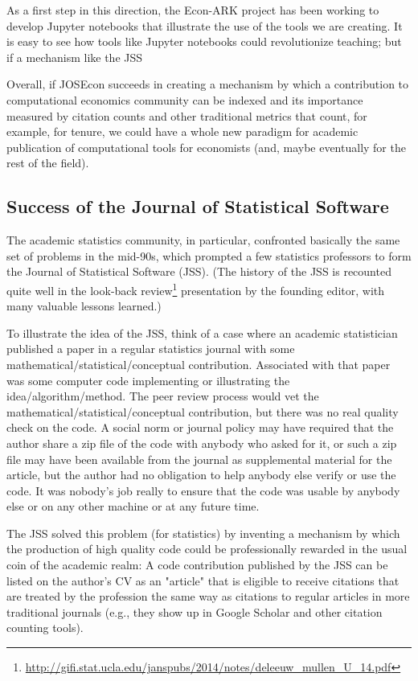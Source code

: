 As a first step in this direction, the Econ-ARK project has been working to develop Jupyter notebooks that illustrate the use of the tools we are creating. It is easy to see how tools like Jupyter notebooks could revolutionize teaching; but if a mechanism like the JSS 

Overall, if JOSEcon succeeds in creating a mechanism by which a contribution to computational economics community can be indexed and its importance measured by citation counts and other traditional metrics that count, for example, for tenure, we could have a whole new paradigm for academic publication of computational tools for economists (and, maybe eventually for the rest of the field).


\subsection{Success of the Journal of Statistical Software}

The academic statistics community, in particular, confronted basically the same set of problems in the mid-90s, which prompted a few statistics professors to form the Journal of Statistical Software (JSS). (The history of the JSS is recounted quite well in the look-back review\footnote{\url{http://gifi.stat.ucla.edu/janspubs/2014/notes/deleeuw_mullen_U_14.pdf}} presentation by the founding editor, with many valuable lessons learned.)


To illustrate the idea of the JSS, think of a case where an academic statistician published a paper in a regular statistics journal with some mathematical/statistical/conceptual contribution. Associated with that paper was some computer code implementing or illustrating the idea/algorithm/method. The peer review process would vet the mathematical/statistical/conceptual contribution, but there was no real quality check on the code. A social norm or journal policy may have required that the author share a zip file of the code with anybody who asked for it, or such a zip file may have been available from the journal as supplemental material for the article, but the author had no obligation to help anybody else verify or use the code. It was nobody's job really to ensure that the code was usable by anybody else or on any other machine or at any future time.

The JSS solved this problem (for statistics) by inventing a mechanism by which the production of high quality code could be professionally rewarded in the usual coin of the academic realm: A code contribution published by the JSS can be listed on the author's CV as an "article" that is eligible to receive citations that are treated by the profession the same way as citations to regular articles in more traditional journals (e.g., they show up in Google Scholar and other citation counting tools).

